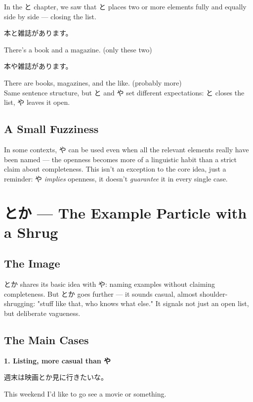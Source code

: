 \documentclass[12pt]{book}
\begin{document}
In the と chapter, we saw that と places two or more elements fully and equally side by side — closing the list.

\par\quad 本と雑誌があります。\\
\par\quad There's a book and a magazine. (only these two)\\

\par\quad 本や雑誌があります。\\
\par\quad There are books, magazines, and the like. (probably more)\\

Same sentence structure, but と and や set different expectations: と closes the list, や leaves it open.

\section*{A Small Fuzziness}

In some contexts, や can be used even when all the relevant elements really have been named — the openness becomes more of a linguistic habit than a strict claim about completeness. This isn't an exception to the core idea, just a reminder: や \emph{implies} openness, it doesn't \emph{guarantee} it in every single case.


\chapter{とか — The Example Particle with a Shrug}

\section*{The Image}

とか shares its basic idea with や: naming examples without claiming completeness. But とか goes further — it sounds casual, almost shoulder-shrugging: "stuff like that, who knows what else." It signals not just an open list, but deliberate vagueness.

\section*{The Main Cases}

\textbf{1. Listing, more casual than や}
\par\quad 週末は映画とか見に行きたいな。\\
\par\quad This weekend I'd like to go see a movie or something.\\
\end{document}
